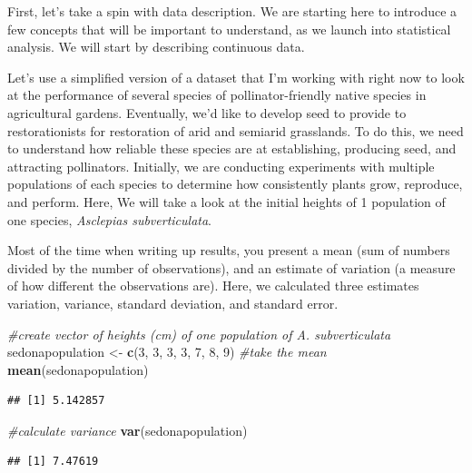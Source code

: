 \documentclass[
]{book}
\newenvironment{Shaded}{\begin{snugshade}}{\end{snugshade}}
\newcommand{\CommentTok}[1]{\textcolor[rgb]{0.56,0.35,0.01}{\textit{#1}}}
\newcommand{\DecValTok}[1]{\textcolor[rgb]{0.00,0.00,0.81}{#1}}
\newcommand{\FunctionTok}[1]{\textcolor[rgb]{0.13,0.29,0.53}{\textbf{#1}}}
\newcommand{\NormalTok}[1]{#1}
\newcommand{\OtherTok}[1]{\textcolor[rgb]{0.56,0.35,0.01}{#1}}
\begin{document}
First, let's take a spin with data description. We are starting here to introduce a few concepts that will be important to understand, as we launch into statistical analysis. We will start by describing continuous data.

Let's use a simplified version of a dataset that I'm working with right now to look at the performance of several species of pollinator-friendly native species in agricultural gardens. Eventually, we'd like to develop seed to provide to restorationists for restoration of arid and semiarid grasslands. To do this, we need to understand how reliable these species are at establishing, producing seed, and attracting pollinators. Initially, we are conducting experiments with multiple populations of each species to determine how consistently plants grow, reproduce, and perform. Here, We will take a look at the initial heights of 1 population of one species, \emph{Asclepias subverticulata}.

Most of the time when writing up results, you present a mean (sum of numbers divided by the number of observations), and an estimate of variation (a measure of how different the observations are). Here, we calculated three estimates variation, variance, standard deviation, and standard error.

\begin{Shaded}
\begin{Highlighting}[]
\CommentTok{\#create vector of heights (cm) of one population of A. subverticulata}
\NormalTok{sedonapopulation }\OtherTok{\textless{}{-}} \FunctionTok{c}\NormalTok{(}\DecValTok{3}\NormalTok{, }\DecValTok{3}\NormalTok{, }\DecValTok{3}\NormalTok{, }\DecValTok{3}\NormalTok{, }\DecValTok{7}\NormalTok{, }\DecValTok{8}\NormalTok{, }\DecValTok{9}\NormalTok{)}
\CommentTok{\#take the mean}
\FunctionTok{mean}\NormalTok{(sedonapopulation)}
\end{Highlighting}
\end{Shaded}

\begin{verbatim}
## [1] 5.142857
\end{verbatim}

\begin{Shaded}
\begin{Highlighting}[]
\CommentTok{\#calculate variance}
\FunctionTok{var}\NormalTok{(sedonapopulation)}
\end{Highlighting}
\end{Shaded}

\begin{verbatim}
## [1] 7.47619
\end{verbatim}
\end{document}
